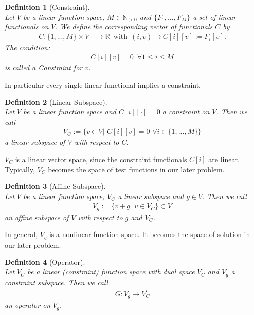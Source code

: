 \documentclass[a4paper,11pt]{article}
\numberwithin{equation}{section}
\newtheorem{definition}{Definition}[section]
\newcommand{\theoremNewline}{\hspace{1mm}\\}
\newcommand{\theoremEndLine}{\hspace{1mm}}
\newcommand{\R}{\mathbb{R}}
\begin{document}
    \begin{definition}[Constraint]\theoremNewline
      Let $V$ be a linear function space, $M \in \mathbb{N}_{>0}$ and $\{ F_1, ..., F_M \}$ a set of linear functionals on $V$. We define the corresponding vector of functionals $C$ by
      \begin{align}
        C: \{1,...,M\} \times V &\rightarrow \R \enspace \mbox{with} \enspace (i,v) \mapsto C[i][v] := F_i[v].
      \end{align}
     The condition:
      \begin{align}
       C[i][v] = 0 \enspace \forall 1 \le i \le M
      \end{align}
     is called a \textnormal{Constraint} for $v$.
    \end{definition}\theoremEndLine
    In particular every single linear functional implies a constraint.

    \begin{definition}[Linear Subspace]\theoremNewline
      Let $V$ be a linear function space and $C[i][\cdot]=0$ a constraint on $V$. Then we call
      \begin{align}
        V_C := \{ v \in V| \hspace{4pt} C[i][v] = 0 \hspace{4pt}\forall i\in\{1,...,M\}\}
      \end{align}
      a \textnormal{linear subspace} of $V$ with respect to $C$.
    \end{definition}\theoremEndLine
    $V_C$ is a linear vector space, since the constraint functionals $C[i]$ are linear. Typically, $V_C$ becomes the space of test functions in our later problem.

    \begin{definition}[Affine Subspace]\theoremNewline
      Let $V$ be a linear function space, $V_C$ a linear subspace and $g \in V$. Then we call
      \begin{align}
        V_{g} := \{ v+g| \hspace{4pt} v \in V_C \} \subset V
      \end{align}
      an \textnormal{affine subspace} of $V$ with respect to $g$ and $V_C$.
    \end{definition}\theoremEndLine
    In general, $V_g$ is a nonlinear function space. It becomes the space of solution in our later problem.

    \begin{definition}[Operator]\theoremNewline
    Let $V_C$ be a linear (constraint) function space with dual space $V^{\prime}_C$ and $V_g$ a constraint subspace. Then we call
      \begin{align}
        G : V_g \rightarrow V^{\prime}_C
      \end{align}
      an \textnormal{operator} on $V_g$.
    \end{definition}\theoremEndLine
\end{document}
